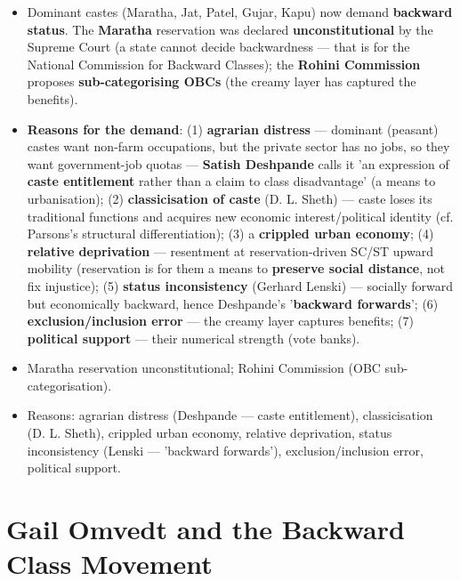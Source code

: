 \begin{KeyConcept}
\begin{itemize}
\item Dominant castes (Maratha, Jat, Patel, Gujar, Kapu) now demand \textbf{backward status}. The \textbf{Maratha} reservation was declared \textbf{unconstitutional} by the Supreme Court (a state cannot decide backwardness --- that is for the National Commission for Backward Classes); the \textbf{Rohini Commission} proposes \textbf{sub-categorising OBCs} (the creamy layer has captured the benefits).
\item \textbf{Reasons for the demand}: (1) \textbf{agrarian distress} --- dominant (peasant) castes want non-farm occupations, but the private sector has no jobs, so they want government-job quotas --- \textbf{Satish Deshpande} calls it 'an expression of \textbf{caste entitlement} rather than a claim to class disadvantage' (a means to urbanisation); (2) \textbf{classicisation of caste} (D. L. Sheth) --- caste loses its traditional functions and acquires new economic interest/political identity (cf. Parsons's structural differentiation); (3) a \textbf{crippled urban economy}; (4) \textbf{relative deprivation} --- resentment at reservation-driven SC/ST upward mobility (reservation is for them a means to \textbf{preserve social distance}, not fix injustice); (5) \textbf{status inconsistency} (Gerhard Lenski) --- socially forward but economically backward, hence Deshpande's '\textbf{backward forwards}'; (6) \textbf{exclusion/inclusion error} --- the creamy layer captures benefits; (7) \textbf{political support} --- their numerical strength (vote banks).
\end{itemize}
\end{KeyConcept}

\begin{QuickRevision}
\begin{itemize}
\item Maratha reservation unconstitutional; Rohini Commission (OBC sub-categorisation).
\item Reasons: agrarian distress (Deshpande --- caste entitlement), classicisation (D. L. Sheth), crippled urban economy, relative deprivation, status inconsistency (Lenski --- 'backward forwards'), exclusion/inclusion error, political support.
\end{itemize}
\end{QuickRevision}

\section{Gail Omvedt and the Backward Class Movement}


